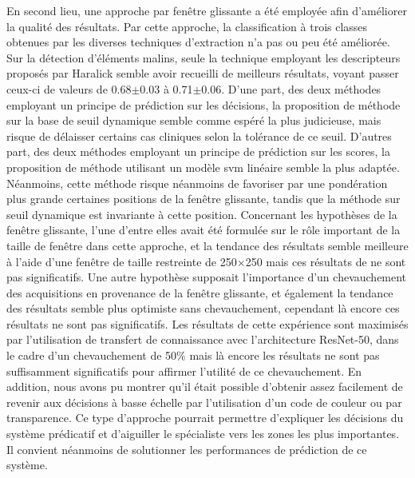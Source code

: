 En second lieu, une approche par fenêtre glissante a été employée afin d'améliorer la qualité des résultats. Par cette approche, la classification à trois classes obtenues par les diverses techniques d'extraction n'a pas ou peu été améliorée. Sur la détection d'éléments malins, seule la technique employant les descripteurs proposés par Haralick semble avoir recueilli de meilleurs résultats, voyant passer ceux-ci de valeurs de \fscore{} 0.68$\pm$0.03 à 0.71$\pm$0.06. D'une part, des deux méthodes employant un principe de prédiction sur les décisions, la proposition de méthode sur la base de seuil dynamique semble comme espéré la plus judicieuse, mais risque de délaisser certains cas cliniques selon la tolérance de ce seuil. D'autres part, des deux méthodes employant un principe de prédiction sur les scores, la proposition de méthode utilisant un modèle \gls{svm} linéaire semble la plus adaptée. Néanmoins, cette méthode risque néanmoins de favoriser par une pondération plus grande certaines positions de la fenêtre glissante, tandis que la méthode sur seuil dynamique est invariante à cette position. Concernant les hypothèses de la fenêtre glissante, l'une d'entre elles avait été formulée sur le rôle important de la taille de fenêtre dans cette approche, et la tendance des résultats semble meilleure à l'aide d’une fenêtre de taille restreinte de 250$\times$250 mais ces résultats de ne sont pas significatifs. Une autre hypothèse supposait l'importance d'un chevauchement des acquisitions en provenance de la fenêtre glissante, et également la tendance des résultats semble plus optimiste sans chevauchement, cependant là encore ces résultats ne sont pas significatifs. Les résultats de cette expérience sont maximisés par l'utilisation de transfert de connaissance avec l'architecture ResNet-50, dans le cadre d'un chevauchement de 50\% mais là encore les résultats ne sont pas suffisamment significatifs pour affirmer l'utilité de ce chevauchement. En addition, nous avons pu montrer qu'il était possible d'obtenir assez facilement de revenir aux décisions à basse échelle par l'utilisation d'un code de couleur ou par transparence. Ce type d'approche pourrait permettre d'expliquer les décisions du système prédicatif et d'aiguiller le spécialiste vers les zones les plus importantes. Il convient néanmoins de solutionner les performances de prédiction de ce système.\par 


